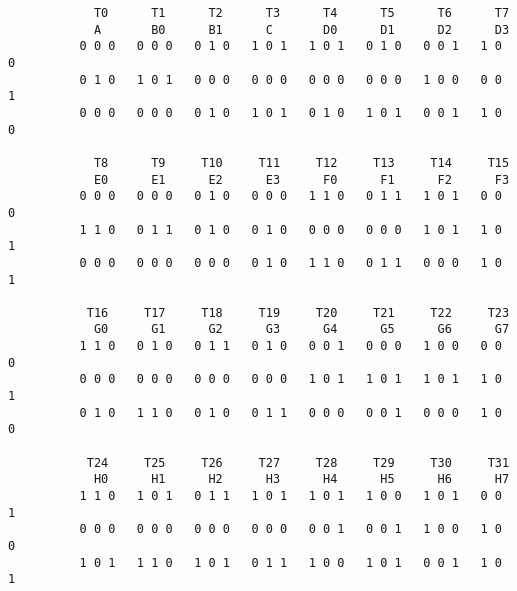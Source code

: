 \documentclass[10pt,a4paper]{article}  %
\begin{document}
\begin{table}[H] 
\caption{
T0--T7: These templates define the possible neighborhoods if the field size $n$ is even,
i.e. when then patterns contain points only. 
T0 represents a point (a one surrounded by zeroes).
T2 is a $90^\circ$ rotation of T1, T4--T7 is a class of equivalents under rotation.
T0--T51: The templates for an odd field size.}


\begin{center}
\footnotesize
\begin{verbatim}
            T0      T1      T2      T3      T4      T5      T6      T7 
            A       B0      B1      C       D0      D1      D2      D3
          0 0 0   0 0 0   0 1 0   1 0 1   1 0 1   0 1 0   0 0 1   1 0 0   
          0 1 0   1 0 1   0 0 0   0 0 0   0 0 0   0 0 0   1 0 0   0 0 1   
          0 0 0   0 0 0   0 1 0   1 0 1   0 1 0   1 0 1   0 0 1   1 0 0  
          
            T8      T9     T10     T11     T12     T13     T14     T15 
            E0      E1      E2      E3      F0      F1      F2      F3
          0 0 0   0 0 0   0 1 0   0 0 0   1 1 0   0 1 1   1 0 1   0 0 0
          1 1 0   0 1 1   0 1 0   0 1 0   0 0 0   0 0 0   1 0 1   1 0 1
          0 0 0   0 0 0   0 0 0   0 1 0   1 1 0   0 1 1   0 0 0   1 0 1
          
           T16     T17     T18     T19     T20     T21     T22     T23
            G0      G1      G2      G3      G4      G5      G6      G7
          1 1 0   0 1 0   0 1 1   0 1 0   0 0 1   0 0 0   1 0 0   0 0 0                                   
          0 0 0   0 0 0   0 0 0   0 0 0   1 0 1   1 0 1   1 0 1   1 0 1                                   
          0 1 0   1 1 0   0 1 0   0 1 1   0 0 0   0 0 1   0 0 0   1 0 0
          
           T24     T25     T26     T27     T28     T29     T30     T31                           
            H0      H1      H2      H3      H4      H5      H6      H7                                                           
          1 1 0   1 0 1   0 1 1   1 0 1   1 0 1   1 0 0   1 0 1   0 0 1                           
          0 0 0   0 0 0   0 0 0   0 0 0   0 0 1   0 0 1   1 0 0   1 0 0            
          1 0 1   1 1 0   1 0 1   0 1 1   1 0 0   1 0 1   0 0 1   1 0 1                                 
          

\end{verbatim}
\end{center}
\end{table}
\end{document}
